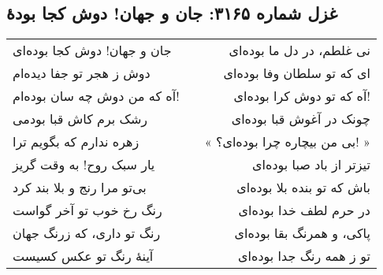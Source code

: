 \begin{center}
\section*{غزل شماره ۳۱۶۵: جان و جهان! دوش کجا بودهٔ}
\label{sec:3165}
\begin{longtable}{l p{0.5cm} r}
جان و جهان! دوش کجا بوده‌ای
&&
نی غلطم، در دل ما بوده‌ای
\\
دوش ز هجر تو جفا دیده‌ام
&&
ای که تو سلطان وفا بوده‌ای
\\
آه که من دوش چه سان بوده‌ام!
&&
آه که تو دوش کرا بوده‌ای!
\\
رشک برم کاش قبا بودمی
&&
چونک در آغوش قبا بوده‌ای
\\
زهره ندارم که بگویم ترا
&&
« بی من بیچاره چرا بوده‌ای؟! »
\\
یار سبک روح! به وقت گریز
&&
تیزتر از باد صبا بوده‌ای
\\
بی‌تو مرا رنج و بلا بند کرد
&&
باش که تو بنده بلا بوده‌ای
\\
رنگ رخ خوب تو آخر گواست
&&
در حرم لطف خدا بوده‌ای
\\
رنگ تو داری، که زرنگ جهان
&&
پاکی، و همرنگ بقا بوده‌ای
\\
آینهٔ رنگ تو عکس کسیست
&&
تو ز همه رنگ جدا بوده‌ای
\\
\end{longtable}
\end{center}

